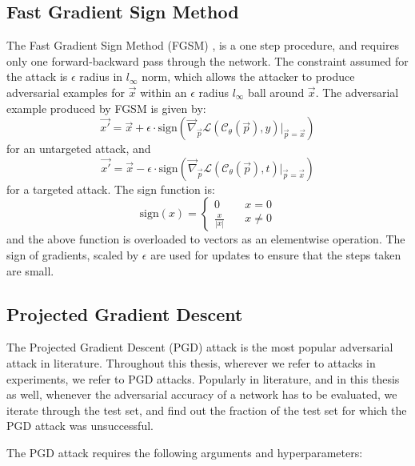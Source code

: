 \documentclass{ociamthesis}
\begin{document}
\subsection{Fast Gradient Sign Method}
The Fast Gradient Sign Method (FGSM) \citep{Goodfellow2015ExplainingAH}, is a
one step procedure, and requires only one forward-backward pass through the
network. The constraint assumed for the attack is $\epsilon$ radius in
$l_\infty$ norm, which allows the attacker to produce adversarial examples for
$\vec{x}$ within an $\epsilon$ radius $l_\infty$ ball around $\vec{x}$. The
adversarial example produced by FGSM is given by:
\begin{equation*}
    \vec{x'}
    = \vec{x} + \epsilon \cdot
    \text{sign}(\vec{\nabla}_\vec{p} \mathcal{L}(\mathcal{C}_\theta (\vec{p}), y)
    \bigr \rvert_{\vec{p}=\vec{x}})
\end{equation*}
for an untargeted attack, and
\begin{equation*}
    \vec{x'}
    = \vec{x} - \epsilon \cdot
    \text{sign}(\vec{\nabla}_\vec{p} \mathcal{L}(\mathcal{C}_\theta (\vec{p}), t)
    \bigr \rvert_{\vec{p}=\vec{x}})
\end{equation*}
for a targeted attack. The sign function is:
\begin{equation*}
    \text{sign}(x) = 
    \left\{
        \begin{array}{ll}
            0 & \quad x = 0 \\
            \frac{x}{|x|} & \quad x \neq 0
        \end{array}
    \right.
\end{equation*}
and the above function is overloaded to vectors as an elementwise operation. The
sign of gradients, scaled by $\epsilon$ are used for updates to ensure that the
steps taken are small.


\subsection{Projected Gradient Descent}
The Projected Gradient Descent (PGD) \citep{madry2019deep} attack is the most
popular adversarial attack in literature. Throughout this thesis, wherever we
refer to attacks in experiments, we refer to PGD attacks. Popularly in
literature, and in this thesis as well, whenever the adversarial accuracy of a
network has to be evaluated, we iterate through the test set, and find out the
fraction of the test set for which the PGD attack was unsuccessful.

The PGD attack requires the following arguments and hyperparameters:
\end{document}
